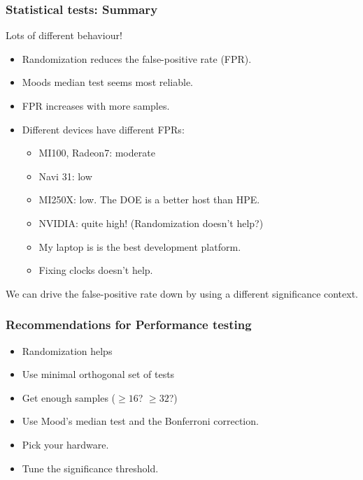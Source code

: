 \documentclass[10pt,aspectratio=169]{beamer}
\begin{document}
\begin{frame}
  \frametitle{Statistical tests: Summary}

  \begin{center}
    Lots of different behaviour!
  \end{center}
  
  \bigskip  \pause
  
  \begin{itemize}
  \item Randomization reduces the false-positive rate (FPR).
  \item Moods median test seems most reliable.
  \item FPR increases with more samples. \pause
  \item Different devices have different FPRs:
    \begin{itemize}
    \item MI100, Radeon7: moderate
    \item Navi 31: low
    \item MI250X: low.  The DOE is a better host than HPE.
    \item NVIDIA: quite high!  (Randomization doesn't help?)
    \item My laptop is is the best development platform.
    \item Fixing clocks doesn't help.
    \end{itemize}
  \end{itemize}

  We can drive the false-positive rate down by using a different significance context.
  
\end{frame}


\begin{frame}
    \frametitle{Recommendations for Performance testing}

    \begin{itemize}
    \item Randomization helps
      \medskip
    \item Use minimal orthogonal set of tests
      \medskip
    \item Get enough samples ($\geq{}16$? $\geq{}32$?)
      \medskip
    \item Use Mood's median test and the Bonferroni correction.
      \medskip
    \item Pick your hardware.
      \medskip
    \item Tune the significance threshold.
    \end{itemize}
    
\end{frame}
\end{document}
